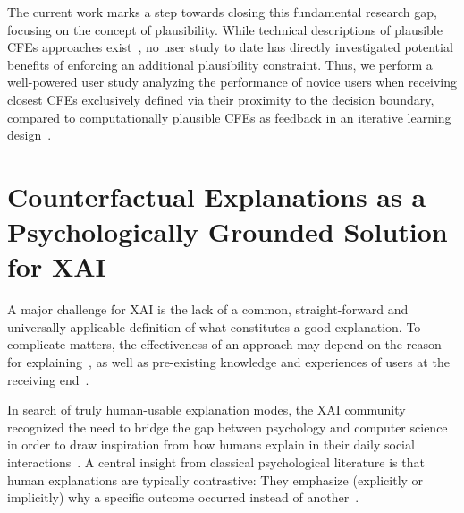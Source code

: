 The current work marks a step towards closing this fundamental research gap, focusing on the concept of plausibility.
While technical descriptions of plausible \glspl{CFE} approaches exist~\citep{smyth_few_2021,schleich_geco_2021,artelt_efficient_2022}, no user study to date has directly investigated potential benefits of enforcing an additional plausibility constraint.
Thus, we perform a well-powered user study analyzing the performance of novice users when receiving closest \glspl{CFE} exclusively defined via their proximity to the decision boundary, compared to computationally plausible \glspl{CFE} as feedback in an iterative learning design~\citep{artelt_convex_2020, artelt_efficient_2022}.

\section{Counterfactual Explanations as a Psychologically Grounded Solution for XAI}\label{subsec:psychoCFs}

A major challenge for \gls{XAI} is the lack of a common, straight-forward and universally applicable definition of what constitutes a good explanation.
To complicate matters, the effectiveness of an approach may depend on the reason for explaining~\citep{adadi_peeking_2018}, as well as pre-existing knowledge and experiences of users at the receiving end~\citep{van_der_waa_evaluating_2021}.

In search of truly human-usable explanation modes, the \gls{XAI} community recognized the need to bridge the gap between psychology and computer science in order to draw inspiration from how humans explain in their daily social interactions~\citep{miller_explanation_2019}.
A central insight from classical psychological literature is that human explanations are typically contrastive: They emphasize (explicitly or implicitly) why a specific outcome occurred instead of another~\citep{miller_explanation_2019, lipton_contrastive_1990, lombrozo_explanation_2012, hilton_knowledge-based_1986}.


